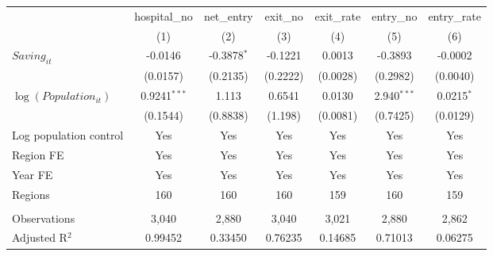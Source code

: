 \begingroup
\centering
\begin{tabular}{lcccccc}
   \toprule
                            & hospital\_no   & net\_entry    & exit\_no  & exit\_rate  & entry\_no     & entry\_rate \\    
                            & (1)            & (2)           & (3)       & (4)         & (5)           & (6)\\  
   \midrule 
   $Saving_{it}$            & -0.0146        & -0.3878$^{*}$ & -0.1221   & 0.0013      & -0.3893       & -0.0002\\   
                            & (0.0157)       & (0.2135)      & (0.2222)  & (0.0028)    & (0.2982)      & (0.0040)\\   
   $\log(Population_{it})$  & 0.9241$^{***}$ & 1.113         & 0.6541    & 0.0130      & 2.940$^{***}$ & 0.0215$^{*}$\\   
                            & (0.1544)       & (0.8838)      & (1.198)   & (0.0081)    & (0.7425)      & (0.0129)\\   
   Log population control   & Yes            & Yes           & Yes       & Yes         & Yes           & Yes\\  
   Region FE                & Yes            & Yes           & Yes       & Yes         & Yes           & Yes\\  
   Year FE                  & Yes            & Yes           & Yes       & Yes         & Yes           & Yes\\  
   Regions                  & 160            & 160           & 160       & 159         & 160           & 159\\  
    \\
   Observations             & 3,040          & 2,880         & 3,040     & 3,021       & 2,880         & 2,862\\  
   Adjusted R$^2$           & 0.99452        & 0.33450       & 0.76235   & 0.14685     & 0.71013       & 0.06275\\  
   \bottomrule
\end{tabular}
\par\endgroup
